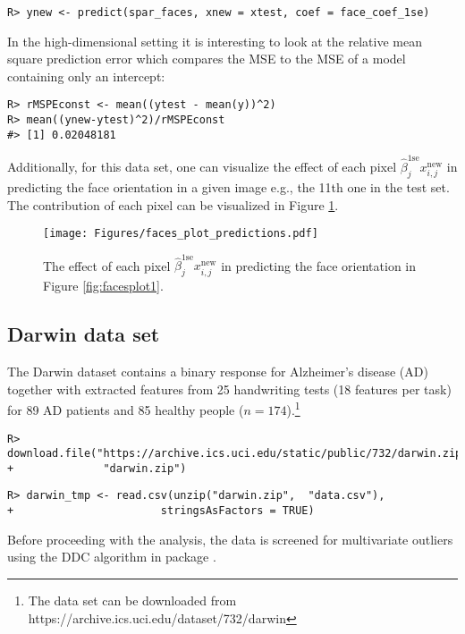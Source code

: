 \documentclass[
  article]{jss}
\begin{document}
\begin{verbatim}
R> ynew <- predict(spar_faces, xnew = xtest, coef = face_coef_1se)
\end{verbatim}

In the high-dimensional setting it is interesting to look at the
relative mean square prediction error which compares the MSE to the MSE
of a model containing only an intercept:

\begin{verbatim}
R> rMSPEconst <- mean((ytest - mean(y))^2) 
R> mean((ynew-ytest)^2)/rMSPEconst
#> [1] 0.02048181
\end{verbatim}

Additionally, for this data set, one can visualize the effect of each
pixel \(\hat\beta^\text{1se}_j x^\text{new}_{i,j}\) in predicting the
face orientation in a given image e.g., the 11th one in the test set.
The contribution of each pixel can be visualized in Figure
\ref{fig:faces_predictions}.

\begin{figure}[t!]
\centering
\texttt{[image: Figures/faces\_plot\_predictions.pdf]}
\caption{The effect of each pixel $\hat\beta^\text{1se}_j x^\text{new}_{i,j}$ in predicting the face orientation in Figure \ref{fig:facesplot1}. \label{fig:faces_predictions}}
\end{figure}

\subsection{Darwin data set}\label{darwin-data-set}

The Darwin dataset \citep{CILIA2022darwin} contains a binary response
for Alzheimer's disease (AD) together with extracted features from 25
handwriting tests (18 features per task) for 89 AD patients and 85
healthy people
(\(n=174\)).\footnote{The data set can be downloaded from  https://archive.ics.uci.edu/dataset/732/darwin}

\begin{verbatim}
R> download.file("https://archive.ics.uci.edu/static/public/732/darwin.zip",
+              "darwin.zip")
\end{verbatim}

\begin{verbatim}
R> darwin_tmp <- read.csv(unzip("darwin.zip",  "data.csv"), 
+                       stringsAsFactors = TRUE)
\end{verbatim}

Before proceeding with the analysis, the data is screened for
multivariate outliers using the DDC algorithm in package 
\citep{rcellwise}.
\end{document}
